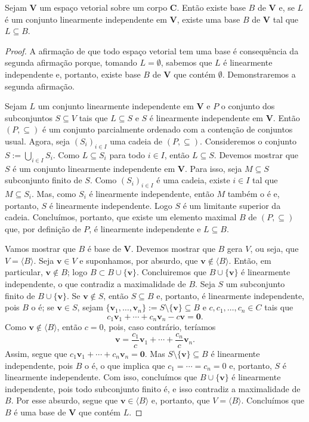 \begin{theorem}
	Sejam $\bm V$ um espaço vetorial sobre um corpo $\bm C$. Então existe base $B$ de $\bm V$ e, se $L$  é um conjunto linearmente independente em $\bm V$, existe uma base $B$ de $\bm V$ tal que $L \subseteq B$.
\end{theorem}
\begin{proof}
	A afirmação de que todo espaço vetorial tem uma base é consequência da segunda afirmação porque, tomando $L=\emptyset$, sabemos que $L$ é linearmente independente e, portanto, existe base $B$ de $\bm V$ que contém $\emptyset$. Demonstraremos a segunda afirmação.

	Sejam $L$ um conjunto linearmente independente em $\bm V$ e $P$ o conjunto dos subconjuntos $S \subseteq V$ tais que $L \subseteq S$ e $S$ é linearmente independente em $\bm V$. Então $(P,\subseteq)$ é um conjunto parcialmente ordenado com a contenção de conjuntos usual. Agora, seja $(S_i)_{i \in I}$ uma cadeia de $(P,\subseteq)$. Consideremos o conjunto $S := \bigcup_{i \in I} S_i$. Como $L \subseteq S_i$ para todo $i \in I$, então $L \subseteq S$. Devemos mostrar que $S$ é um conjunto linearmente independente em $\bm V$. Para isso, seja $M \subseteq S$ subconjunto finito de $S$. Como $(S_i)_{i \in I}$ é uma cadeia, existe $i \in I$ tal que $M \subseteq S_i$. Mas, como $S_i$ é linearmente independente, então $M$ também o é e, portanto, $S$ é linearmente independente. Logo $S$ é um limitante superior da cadeia. Concluímos, portanto, que existe um elemento maximal $B$ de $(P,\subseteq)$ que, por definição de $P$, é linearmente independente e $L \subseteq B$.

	Vamos mostrar que $B$ é base de $\bm V$. Devemos mostrar que $B$ gera $V$, ou seja, que $V=\langle B \rangle$.
Seja $\bm v \in V$ e suponhamos, por absurdo, que $\bm v \notin \langle B \rangle$. Então, em particular, $\bm v \notin B$; logo $B \subset B \cup \{\bm v\}$. Concluiremos que $B \cup \{\bm v\}$ é linearmente independente, o que contradiz a maximalidade de $B$. Seja $S$ um subconjunto finito de $B \cup \{\bm v\}$. Se $\bm v \notin S$, então $S \subseteq B$ e, portanto, é linearmente independente, pois $B$ o é; se $\bm v \in S$, sejam $\{\bm v_1,\ldots,\bm v_n\} := S \setminus \{\bm v\} \subseteq B$ e $c,c_1,\ldots,c_n \in C$ tais que
	\begin{equation*}
	c_1\bm v_1 + \cdots + c_n\bm v_n -c\bm v=\bm 0.
	\end{equation*}
Como $\bm v \notin \langle B \rangle$, então $c=0$, pois, caso contrário, teríamos
	\begin{equation*}
	\bm v=\frac{c_1}{c}\bm v_1 + \cdots + \frac{c_n}{c}\bm v_n.
	\end{equation*}
Assim, segue que $c_1\bm v_1 + \cdots + c_n\bm v_n=\bm 0$. Mas $S \setminus \{\bm v\} \subseteq B$ é linearmente independente, pois $B$ o é, o que implica que $c_1=\cdots=c_n=0$ e, portanto, $S$ é linearmente independente. Com isso, concluímos que $B \cup \{\bm v\}$ é linearmente independente, pois todo subconjunto finito é, e isso contradiz a maximalidade de $B$. Por esse absurdo, segue que $\bm v \in \langle B \rangle$ e, portanto, que $V=\langle B \rangle$. Concluímos que $B$ é uma base de $\bm V$ que contém $L$.
\end{proof}

